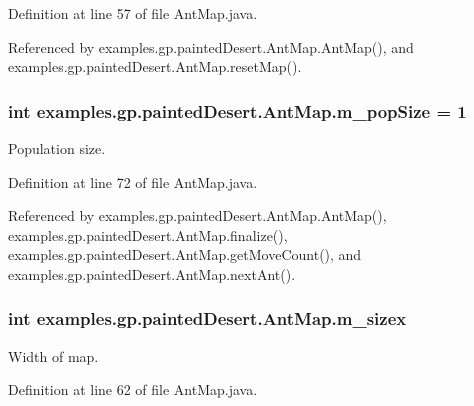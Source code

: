 Definition at line 57 of file Ant\-Map.\-java.



Referenced by examples.\-gp.\-painted\-Desert.\-Ant\-Map.\-Ant\-Map(), and examples.\-gp.\-painted\-Desert.\-Ant\-Map.\-reset\-Map().

\hypertarget{classexamples_1_1gp_1_1painted_desert_1_1_ant_map_a439ba6a19eee3c4f59c95e80dc2cede7}{
\subsubsection[{m\-\_\-pop\-Size}]{\setlength{\rightskip}{0pt plus 5cm}int examples.\-gp.\-painted\-Desert.\-Ant\-Map.\-m\-\_\-pop\-Size = 1\hspace{0.3cm}{\ttfamily [private]}}}\label{classexamples_1_1gp_1_1painted_desert_1_1_ant_map_a439ba6a19eee3c4f59c95e80dc2cede7}
Population size. 

Definition at line 72 of file Ant\-Map.\-java.



Referenced by examples.\-gp.\-painted\-Desert.\-Ant\-Map.\-Ant\-Map(), examples.\-gp.\-painted\-Desert.\-Ant\-Map.\-finalize(), examples.\-gp.\-painted\-Desert.\-Ant\-Map.\-get\-Move\-Count(), and examples.\-gp.\-painted\-Desert.\-Ant\-Map.\-next\-Ant().

\hypertarget{classexamples_1_1gp_1_1painted_desert_1_1_ant_map_a016b600ade182674d82cedec8742ce8b}{
\subsubsection[{m\-\_\-sizex}]{\setlength{\rightskip}{0pt plus 5cm}int examples.\-gp.\-painted\-Desert.\-Ant\-Map.\-m\-\_\-sizex\hspace{0.3cm}{\ttfamily [private]}}}\label{classexamples_1_1gp_1_1painted_desert_1_1_ant_map_a016b600ade182674d82cedec8742ce8b}
Width of map. 

Definition at line 62 of file Ant\-Map.\-java.



